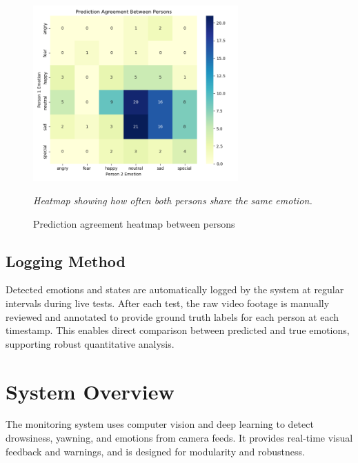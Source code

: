 \documentclass[12pt]{article}
\begin{document}
\begin{figure}[h!]
    \centering
    \includegraphics[width=0.7\textwidth]{model_analysis/prediction_agreement_heatmap.png}
    \caption{Prediction agreement heatmap between persons}
    \textit{Heatmap showing how often both persons share the same emotion.}
\end{figure}

\subsection{Logging Method}
Detected emotions and states are automatically logged by the system at regular intervals during live tests. After each test, the raw video footage is manually reviewed and annotated to provide ground truth labels for each person at each timestamp. This enables direct comparison between predicted and true emotions, supporting robust quantitative analysis.

\section{System Overview}
The monitoring system uses computer vision and deep learning to detect drowsiness, yawning, and emotions from camera feeds. It provides real-time visual feedback and warnings, and is designed for modularity and robustness.
\end{document}
